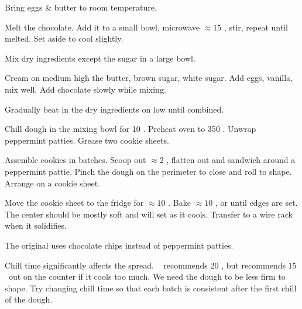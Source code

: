 \begin{preparation}
\item Bring eggs \& butter to room temperature.

\item Melt the chocolate.
    Add it to a small bowl, microwave $\approx 15$ \second, stir, repeat until melted.
    Set aside to cool slightly.

\item Mix dry ingredients except the sugar in a large bowl.

\item Cream on medium high the butter, brown sugar, white sugar.
    Add eggs, vanilla, mix well.
    Add chocolate slowly while mixing.

\item Gradually beat in the dry ingredients on low until combined.

\item Chill dough in the mixing bowl for 10 \minute.
    Preheat oven to 350 \Fahrenheit.
    Unwrap peppermint patties.
    Grease two cookie sheets.

\item Assemble cookies in batches.
    Scoop out $\approx2$ \Tablespoon, flatten out and sandwich around a
    peppermint pattie.
    Pinch the dough on the perimeter to close and roll to shape.
    Arrange on a cookie sheet.

\item Move the cookie sheet to the fridge for $\approx 10$ \minute.
    Bake $\approx 10$ \minute, or until edges are set.
    The center should be mostly soft and will set as it cools.
    Transfer to a wire rack when it solidifies.
\end{preparation}

\begin{variation}
\item The original uses chocolate chips instead of peppermint patties.
\end{variation}

\begin{experiments}
\item Chill time significantly affects the spread.
    \citeauthor{sallyBrownies2020}~\cite{sallyBrownies2020} recommends 20
    \minute, but recommends 15 \minute~out on the counter if it cools too much.
    We need the dough to be less firm to shape.
    Try changing chill time so that each batch is consistent after the first
    chill of the dough.
\end{experiments}

\recipeend%
